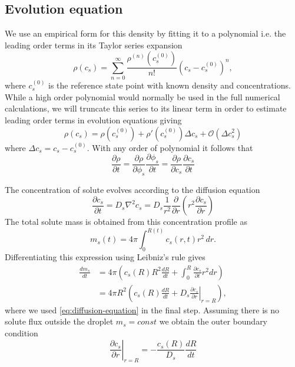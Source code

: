 \documentclass[12pt,twoside]{report}
\begin{document}
\subsection{Evolution equation}

We use an empirical form for this density by fitting it to a polynomial i.e. the leading order terms in its Taylor series expansion
\begin{equation}
  \rho(c_s) = \sum_{n=0}^{\infty} \frac{\rho^{(n)}(c_s^{(0)})}{n!} (c_s - c_s^{(0)})^n,
\end{equation}
where $c_s^{(0)}$ is the reference state point with known density and concentrations.
While a high order polynomial would normally be used in the full numerical calculations, we will truncate this series to its linear term in order to estimate leading order terms in evolution equations giving
\begin{equation}\label{eq:density-expansion}
  \rho(c_s) = \rho(c_s^{(0)}) + \rho'(c_s^{(0)}) \Delta c_s + \mathcal{O}(\Delta c_s^2)
\end{equation}
where $\Delta c_s = c_s - c_s^{(0)}$.
With any order of polynomial it follows that
\begin{equation}\label{eq:linear-density-regime}
  \frac{\partial \rho}{\partial t}
  = \frac{\partial \rho}{\partial \phi_s} \frac{\partial \phi_s}{\partial t}
  = \frac{\partial \rho}{\partial c_s} \frac{\partial c_s}{\partial t}
\end{equation}

The concentration of solute evolves according to the diffusion equation
\begin{equation}\label{eq:diffusion-equation}
  \frac{\partial c_s}{\partial t}
  = D_s \nabla^2 c_s
  = D_s \frac{1}{r^2} \frac{\partial}{\partial r} \left( r^2 \frac{\partial c_s}{\partial r} \right)
\end{equation}
The total solute mass is obtained from this concentration profile as
\begin{equation}\label{eq:solute-mass-equation}
  m_s(t) = 4\pi \int_0^{R(t)} c_s(r,t) r^2 \, dr.
\end{equation}
Differentiating this expression using Leibniz's rule gives
\begin{equation}
  \begin{aligned}
    \frac{dm_s}{dt} &=
    4\pi \left(
    c_s(R) R^2 \frac{dR}{dt} + \int_0^R \frac{\partial c_s}{\partial t} r^2 dr
    \right) \\
    &=
    4\pi R^2 \left(
    c_s(R) \frac{dR}{dt} + D_s \left.\frac{\partial c_s}{\partial r}\right|_{r=R}
    \right),
  \end{aligned}
\end{equation}
where we used \eqref{eq:diffusion-equation} in the final step.
Assuming there is no solute flux outside the droplet $m_s = const$ we obtain the outer boundary condition
\begin{equation}
  \left.\frac{\partial c_s}{\partial r}\right|_{r=R} = -\frac{c_s(R)}{D_s} \frac{dR}{dt}
\end{equation}
\end{document}
